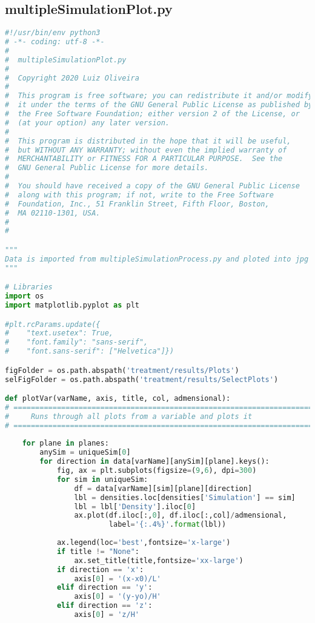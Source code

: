 \subsection{multipleSimulationPlot.py}
\begin{lstlisting}[language=python]
#!/usr/bin/env python3
# -*- coding: utf-8 -*-
#
#  multipleSimulationPlot.py
#  
#  Copyright 2020 Luiz Oliveira
#  
#  This program is free software; you can redistribute it and/or modify
#  it under the terms of the GNU General Public License as published by
#  the Free Software Foundation; either version 2 of the License, or
#  (at your option) any later version.
#  
#  This program is distributed in the hope that it will be useful,
#  but WITHOUT ANY WARRANTY; without even the implied warranty of
#  MERCHANTABILITY or FITNESS FOR A PARTICULAR PURPOSE.  See the
#  GNU General Public License for more details.
#  
#  You should have received a copy of the GNU General Public License
#  along with this program; if not, write to the Free Software
#  Foundation, Inc., 51 Franklin Street, Fifth Floor, Boston,
#  MA 02110-1301, USA.
#  
#  

"""
Data is imported from multipleSimulationProcess.py and ploted into jpg figures
"""

# Libraries
import os
import matplotlib.pyplot as plt

#plt.rcParams.update({
#    "text.usetex": True,
#    "font.family": "sans-serif",
#    "font.sans-serif": ["Helvetica"]})

figFolder = os.path.abspath('treatment/results/Plots')
selFigFolder = os.path.abspath('treatment/results/SelectPlots')

def plotVar(varName, axis, title, col, admensional):
# =============================================================================
#     Runs through all plots from a variable and plots it
# =============================================================================
    
    for plane in planes:
        anySim = uniqueSim[0]
        for direction in data[varName][anySim][plane].keys():
            fig, ax = plt.subplots(figsize=(9,6), dpi=300)
            for sim in uniqueSim:
                df = data[varName][sim][plane][direction]
                lbl = densities.loc[densities['Simulation'] == sim]
                lbl = lbl['Density'].iloc[0]
                ax.plot(df.iloc[:,0], df.iloc[:,col]/admensional,
                        label='{:.4%}'.format(lbl))
    
            ax.legend(loc='best',fontsize='x-large')
            if title != "None":
                ax.set_title(title,fontsize='xx-large')
            if direction == 'x':
                axis[0] = '(x-x0)/L'
            elif direction == 'y':
                axis[0] = '(y-yo)/H'
            elif direction == 'z':
                axis[0] = 'z/H'
                

\end{lstlisting}
